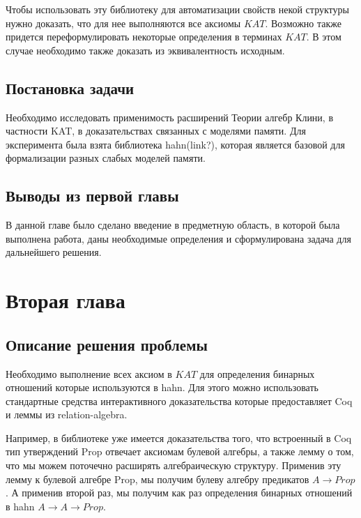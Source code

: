 \documentclass[times
              ]{itmo-student-thesis}
\begin{document}
    Чтобы использовать эту библиотеку для автоматизации свойств некой структуры нужно доказать, что для нее выполняются все аксиомы $ KAT $. Возможно также придется переформулировать некоторые определения в терминах $ KAT $. В этом случае необходимо также доказать из эквивалентность исходным.


  \section{Постановка задачи}
    Необходимо исследовать применимость расширений Теории алгебр Клини, в частности KAT, в доказательствах связанных с моделями памяти.
    Для эксперимента была взята библиотека hahn(link?), которая является базовой для формализации разных слабых моделей памяти.

  \section{Выводы из первой главы}
    В данной главе было сделано введение в предметную область, в которой была выполнена работа, даны необходимые определения и сформулирована задача для дальнейшего решения.
 \chapter{Вторая глава}

   \section{Описание решения проблемы}

   Необходимо выполнение всех аксиом в $ KAT $ для определения бинарных отношений которые используются в hahn. Для этого можно использовать стандартные средства интерактивного доказательства которые предоставляет Coq и леммы из relation-algebra.

   Например, в библиотеке уже имеется доказательства того, что встроенный в Coq тип утверждений Prop отвечает аксиомам булевой алгебры, а также лемму о том, что мы можем поточечно расширять алгебраическую структуру. Применив эту лемму к булевой алгебре Prop, мы получим булеву алгебру предикатов $ A \rightarrow Prop $. А применив второй раз, мы получим как раз определения бинарных отношений в hahn $ A \rightarrow A \rightarrow Prop $.
\end{document}
